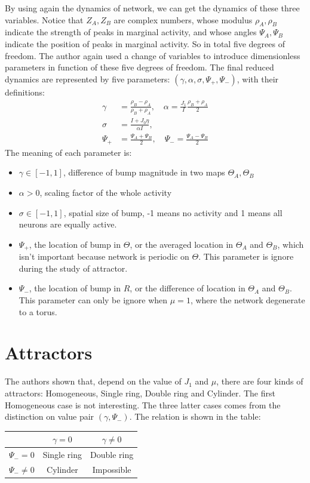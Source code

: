 \documentclass{article}
\begin{document}
	By using again the dynamics of network, we can get the dynamics of these three variables. Notice that $Z_A, Z_B$ are complex numbers, whose modulus $\rho_A,\rho_B$ indicate the strength of peaks in marginal activity, and whose angles $\Psi_A,\Psi_B$ indicate the position of peaks in marginal activity. So in total five degrees of freedom. The author again used a change of variables to introduce dimensionless parameters in function of these five degrees of freedom. The final reduced dynamics are represented by five parameters: $(\gamma, \alpha, \sigma, \Psi_+, \Psi_-)$, with their definitions:
	\begin{equation}
	\begin{split}
	\gamma&=\frac{\rho_B-\rho_A}{\rho_B+\rho_A},\quad \alpha=\frac{J_1}{I}\frac{\rho_B+\rho_A}{2}\\
	\sigma&=\frac{I+J_0\eta}{\alpha I},\quad\\
	\Psi_+ &= \frac{\Psi_A+\Psi_B}{2},\quad \Psi_- = \frac{\Psi_A-\Psi_B}{2}
	\end{split}
	\end{equation}
	The meaning of each parameter is:
	\begin{itemize}
		\item $\gamma\in[-1,1]$, difference of bump magnitude in two maps $\Theta_A,\Theta_B$
		\item $\alpha>0$, scaling factor of the whole activity
		\item $\sigma\in[-1,1]$, spatial size of bump, -1 means no activity and 1 means all neurons are equally active. 
		\item $\Psi_+$, the location of bump in $\Theta$, or the averaged location in $\Theta_A$ and $\Theta_B$, which isn't important because network is periodic on $\Theta$. This parameter is ignore during the study of attractor.
		\item $\Psi_-$, the location of bump in $R$, or the difference of location in $\Theta_A$ and $\Theta_B$. This parameter can only be ignore when $\mu=1$, where the network degenerate to a torus.
	\end{itemize}
	
	\section{Attractors}
	The authors shown that, depend on the value of $J_1$ and $\mu$, there are four kinds of attractors: Homogeneous, Single ring, Double ring and Cylinder. The first Homogeneous case is not interesting. The three latter cases comes from the distinction on value pair $(\gamma,\Psi_-)$. The relation is shown in the table:
	\begin{center}
		\begin{tabular}{ | c | c | c | }
			\hline
			               & $\gamma=0$  & $\gamma\neq 0$ \\ \hline
			$\Psi_-=0$     & Single ring & Double ring \\ \hline
			$\Psi_-\neq 0$ & Cylinder    & Impossible  \\
			\hline
		\end{tabular}
	\end{center}
\end{document}
